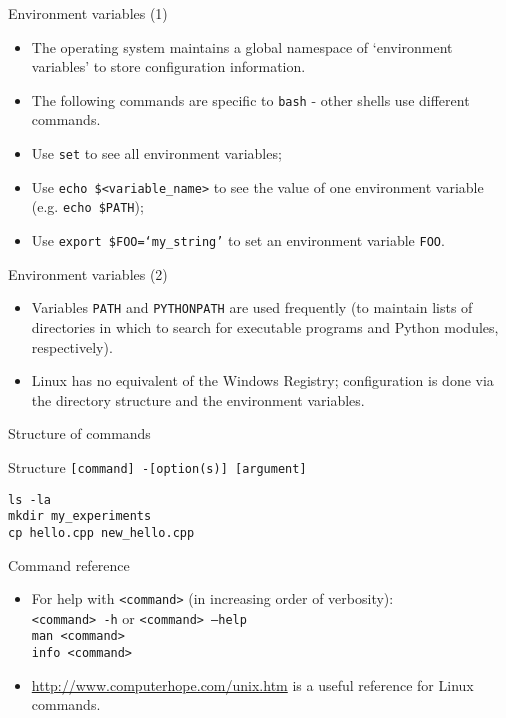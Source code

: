 \documentclass[dvipsnames]{beamer}
\newcommand{\command}[1]{\colorbox{light-gray}{\texttt{#1}}}
\begin{document}
\begin{frame}{Environment variables (1)}
  \begin{itemize}
    \item The operating system maintains a global namespace of `environment variables' to store configuration information.
    \item The following commands are specific to \command{bash} - other shells use different commands.
    \item Use  \command{set} to see all environment variables;
    \item Use \command{echo \$<variable\_name>} to see the value of one environment variable (e.g. \command{echo \$PATH});
    \item Use \command{export \$FOO=`my\_string'} to set an environment variable \texttt{FOO}.
  \end{itemize}
\end{frame}


\begin{frame}{Environment variables (2)}
  \begin{itemize}
    \item Variables \texttt{PATH} and \texttt{PYTHONPATH} are used frequently (to maintain lists of directories in which to search for executable programs and Python modules, respectively).
    \item Linux has no equivalent of the Windows Registry; configuration is done via the directory structure and the environment variables.
  \end{itemize}
\end{frame}


\begin{frame}{Structure of commands}
  \begin{block}{Structure}
    \command{[command] -[option(s)] [argument]}
  \end{block}
  \begin{Examples}
     \command{ls -la} \\
     \command{mkdir my\_experiments} \\
     \command{cp hello.cpp new\_hello.cpp}
  \end{Examples}
\end{frame}


\begin{frame}{Command reference}
  \begin{itemize}
  \item For help with \command{<command>} (in increasing order of verbosity): \\ \command{<command> -h} or \command{<command> --help} \\ \command{man <command>} \\ \command{info <command>}
  \item \url{http://www.computerhope.com/unix.htm} is a useful reference for Linux commands.
\end{itemize}
\end{frame}
\end{document}

